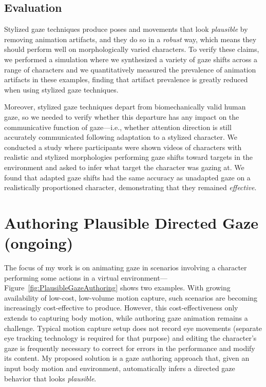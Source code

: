 \subsection{Evaluation}

Stylized gaze techniques produce poses and movements that look \emph{plausible} by removing animation artifacts, and they do so in a \emph{robust} way, which means they should perform well on morphologically varied characters. To verify these claims, we performed a simulation where we synthesized a variety of gaze shifts across a range of characters and we quantitatively measured the prevalence of animation artifacts in these examples, finding that artifact prevalence is greatly reduced when using stylized gaze techniques.

Moreover, stylized gaze techniques depart from biomechanically valid human gaze, so we needed to verify whether this departure has any impact on the communicative function of gaze---i.e., whether attention direction is still accurately communicated following adaptation to a stylized character. We conducted a study where participants were shown videos of characters with realistic and stylized morphologies performing gaze shifts toward targets in the environment and asked to infer what target the character was gazing at. We found that adapted gaze shifts had the same accuracy as unadapted gaze on a realistically proportioned character, demonstrating that they remained \emph{effective}.

\section{Authoring Plausible Directed Gaze (ongoing)}
\label{sec:GazeAuthoring}

The focus of my work is on animating gaze in scenarios involving a character performing some actions in a virtual environment---Figure~\ref{fig:PlausibleGazeAuthoring} shows two examples. With growing availability of low-cost, low-volume motion capture, such scenarios are becoming increasingly cost-effective to produce. However, this cost-effectiveness only extends to capturing body motion, while authoring gaze animation remains a challenge. Typical motion capture setup does not record eye movements (separate eye tracking technology is required for that purpose) and editing the character's gaze is frequently necessary to correct for errors in the performance and modify its content. My proposed solution is a gaze authoring approach that, given an input body motion and environment, automatically infers a directed gaze behavior that looks \emph{plausible}.


